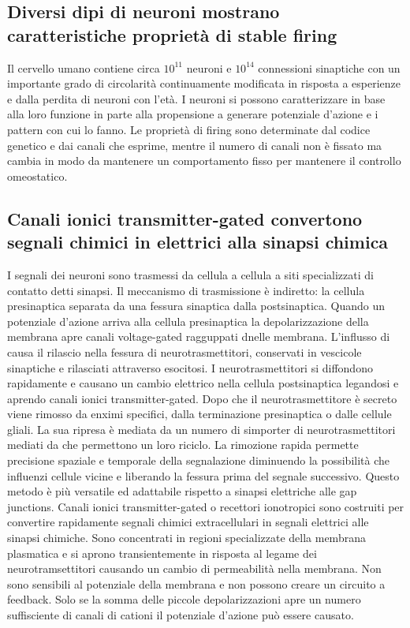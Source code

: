 \subsection{Diversi dipi di neuroni mostrano caratteristiche propriet\`a di stable firing}
Il cervello umano contiene circa $10^{11}$ neuroni e $10^{14}$ connessioni sinaptiche con un importante grado di circolarit\`a continuamente modificata in risposta a esperienze e dalla
perdita di neuroni con l'et\`a. I neuroni si possono caratterizzare in base alla loro funzione in parte alla propensione a generare potenziale d'azione e i pattern con cui lo fanno. 
Le propriet\`a di firing sono determinate dal codice genetico e dai canali che esprime, mentre il numero di canali non \`e fissato ma cambia in modo da mantenere un comportamento fisso
per mantenere il controllo omeostatico. 
\subsection{Canali ionici transmitter-gated convertono segnali chimici in elettrici alla sinapsi chimica}
I segnali dei neuroni sono trasmessi da cellula a cellula a siti specializzati di contatto detti sinapsi. Il meccanismo di trasmissione \`e indiretto: la cellula presinaptica separata
da una fessura sinaptica dalla postsinaptica. Quando un potenziale d'azione arriva alla cellula presinaptica la depolarizzazione della membrana apre canali voltage-gated 
ragguppati dnelle membrana. L'influsso di  causa il rilascio nella fessura di neurotrasmettitori, conservati in vescicole sinaptiche e rilasciati attraverso esocitosi. I
neurotrasmettitori si diffondono rapidamente e causano un cambio elettrico nella cellula postsinaptica legandosi e aprendo canali ionici transmitter-gated. Dopo che il neurotrasmettitore
\`e secreto viene rimosso da enximi specifici, dalla terminazione presinaptica o dalle cellule gliali. La sua ripresa \`e mediata da un numero di simporter di neurotrasmettitori mediati
da  che permettono un loro riciclo. La rimozione rapida permette precisione spaziale e temporale della segnalazione diminuendo la possibilit\`a che influenzi cellule vicine e
liberando la fessura prima del segnale successivo. Questo metodo \`e pi\`u versatile ed adattabile rispetto a sinapsi elettriche alle gap junctions. Canali ionici transmitter-gated o 
recettori ionotropici sono costruiti per convertire rapidamente segnali chimici extracellulari in segnali elettrici alle sinapsi chimiche. Sono concentrati in regioni specializzate
della membrana plasmatica e si aprono transientemente in risposta al legame dei neurotramsettitori causando un cambio di permeabilit\`a nella membrana. Non sono sensibili al potenziale
della membrana e non possono creare un circuito a feedback. Solo se la somma delle piccole depolarizzazioni apre un numero suffisciente di canali di cationi il potenziale d'azione pu\`o
essere causato.
